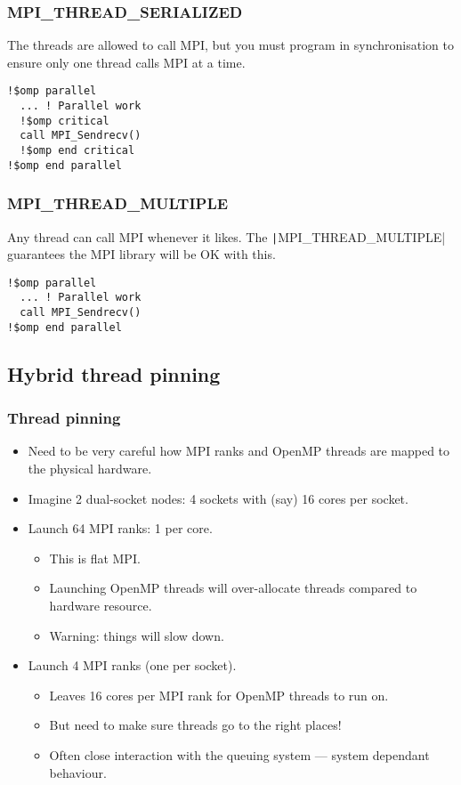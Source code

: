 \documentclass{beamer}
\begin{document}
\begin{frame}[fragile]
\frametitle{MPI\_THREAD\_SERIALIZED}
The threads are allowed to call MPI, but you must program in synchronisation to ensure only one thread calls MPI at a time.
\begin{verbatim}
!$omp parallel
  ... ! Parallel work
  !$omp critical
  call MPI_Sendrecv()
  !$omp end critical
!$omp end parallel
\end{verbatim}
\end{frame}

\begin{frame}[fragile]
\frametitle{MPI\_THREAD\_MULTIPLE}
Any thread can call MPI whenever it likes. The \texttt|MPI_THREAD_MULTIPLE| guarantees the MPI library will be OK with this.
\begin{verbatim}
!$omp parallel
  ... ! Parallel work
  call MPI_Sendrecv()
!$omp end parallel
\end{verbatim}
\end{frame}

\subsection{Hybrid thread pinning}
\begin{frame}
\frametitle{Thread pinning}
\begin{itemize}
  \item Need to be very careful how MPI ranks and OpenMP threads are mapped to the physical hardware.
  \item Imagine 2 dual-socket nodes: 4 sockets with (say) 16 cores per socket.
  \item Launch 64 MPI ranks: 1 per core.
    \begin{itemize}
      \item This is flat MPI.
      \item Launching OpenMP threads will over-allocate threads compared to hardware resource.
      \item Warning: things will slow down.
    \end{itemize}
  \item Launch 4 MPI ranks (one per socket).
    \begin{itemize}
      \item Leaves 16 cores per MPI rank for OpenMP threads to run on.
      \item But need to make sure threads go to the right places!
      \item Often close interaction with the queuing system --- system dependant behaviour.
    \end{itemize}
\end{itemize}
\end{frame}
\end{document}

